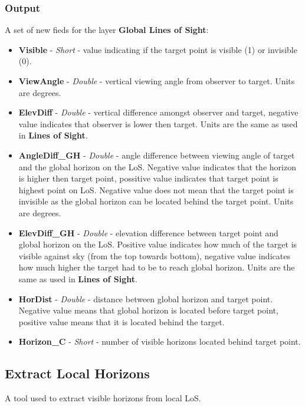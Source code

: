 \documentclass[]{article}
\begin{document}
\subsubsection{Output}

A set of new fieds for the layer \textbf{Global Lines of Sight}:
\begin{itemize}
	\item \textbf{Visible} - \textit{Short} - value indicating if the target point is visible (1) or invisible (0).
	\item \textbf{ViewAngle} - \textit{Double} - vertical viewing angle from observer to target. Units are degrees.
	\item \textbf{ElevDiff} - \textit{Double} - vertical difference amongst observer and target, negative value indicates that observer is lower then target. Units are the same as used in \textbf{Lines of Sight}.
	\item \textbf{AngleDiff\_GH} - \textit{Double} - angle difference between viewing angle of target and the global horizon on the LoS. Negative value indicates that the horizon is higher then target point, possitive value indicates that target point is highest point on LoS. Negative value does not mean that the target point is invisible as the global horizon can be located behind the target point. Units are degrees.
	\item \textbf{ElevDiff\_GH} - \textit{Double} - elevation difference between target point and global horizon on the LoS. Positive value indicates how much of the target is visible against sky (from the top towards bottom), negative value indicates how much higher the target had to be to reach global horizon. Units are the same as used in \textbf{Lines of Sight}.
	\item \textbf{HorDist} - \textit{Double} - distance between global horizon and target point. Negative value means that global horizon is located before target point, positive value means that it is located behind the target. 
	\item \textbf{Horizon\_C} - \textit{Short} - number of visible horizons located behind target point.
\end{itemize}


\subsection{Extract Local Horizons}

A tool used to extract visible horizons from local LoS. 
\end{document}
